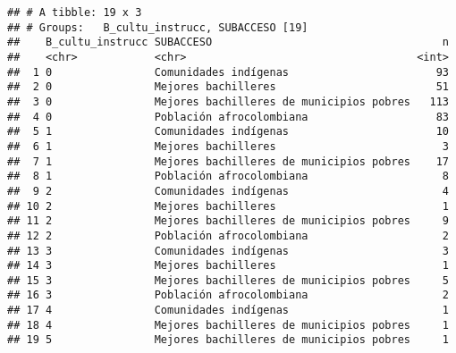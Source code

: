 \documentclass[]{article}
\theoremstyle{definition}
\theoremstyle{definition}
\theoremstyle{definition}
\theoremstyle{remark}
\begin{document}
\begin{verbatim}
## # A tibble: 19 x 3
## # Groups:   B_cultu_instrucc, SUBACCESO [19]
##    B_cultu_instrucc SUBACCESO                                    n
##    <chr>            <chr>                                    <int>
##  1 0                Comunidades indígenas                       93
##  2 0                Mejores bachilleres                         51
##  3 0                Mejores bachilleres de municipios pobres   113
##  4 0                Población afrocolombiana                    83
##  5 1                Comunidades indígenas                       10
##  6 1                Mejores bachilleres                          3
##  7 1                Mejores bachilleres de municipios pobres    17
##  8 1                Población afrocolombiana                     8
##  9 2                Comunidades indígenas                        4
## 10 2                Mejores bachilleres                          1
## 11 2                Mejores bachilleres de municipios pobres     9
## 12 2                Población afrocolombiana                     2
## 13 3                Comunidades indígenas                        3
## 14 3                Mejores bachilleres                          1
## 15 3                Mejores bachilleres de municipios pobres     5
## 16 3                Población afrocolombiana                     2
## 17 4                Comunidades indígenas                        1
## 18 4                Mejores bachilleres de municipios pobres     1
## 19 5                Mejores bachilleres de municipios pobres     1
\end{verbatim}
\end{document}
